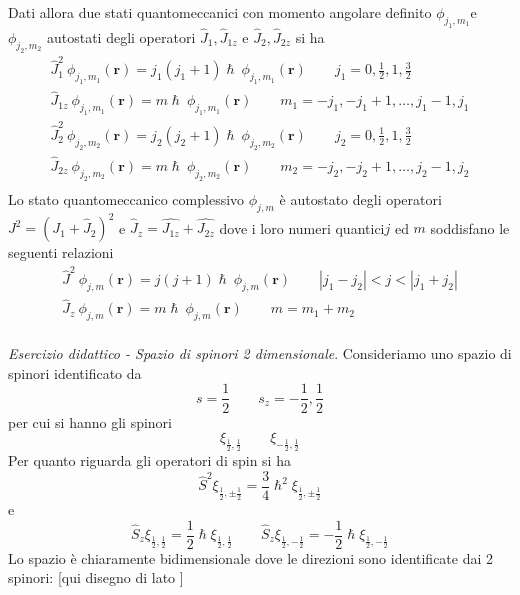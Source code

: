 Dati allora due stati quantomeccanici con momento angolare definito
\(\phi_{j_{1},m_{1}}\)e \(\phi_{j_{2},m_{2}}\) autostati degli operatori
\(\hat{J}_{1},\hat{J}_{1z}\) e \(\hat{J}_{2}, \hat{J}_{2z}\) si ha \begin{gather*}
    \hat{J}_{1}^{2} \ \phi_{j_{1},m_{1}}(\bm{r}) = j_{1}(j_{1}+1) \hslash \ \phi_{j_{1},m_{1}}(\bm{r}) \qquad j_{1} = 0, \frac{1}{2}, 1, \frac{3}{2}\\
    \hat{J}_{1z} \ \phi_{j_{1},m_{1}}(\bm{r}) = m \hslash \ \phi_{j_{1},m_{1}}(\bm{r})  \qquad m_{1} = -j_{1} , -j_{1} +1, \dots , j_{1}-1, j_{1}\\
    \hat{J}_{2}^{2} \ \phi_{j_{2},m_{2}}(\bm{r}) = j_{2}(j_{2}+1) \hslash \ \phi_{j_{2},m_{2}}(\bm{r}) \qquad j_{2} = 0, \frac{1}{2}, 1, \frac{3}{2}\\
    \hat{J}_{2z} \ \phi_{j_{2},m_{2}}(\bm{r}) = m \hslash \ \phi_{j_{2},m_{2}}(\bm{r})  \qquad m_{2} = -j_{2} , -j_{2} +1, \dots , j_{2}-1, j_{2}\\
\end{gather*} Lo stato quantomeccanico complessivo \(\phi_{j,m}\) è autostato degli
operatori \(J^{2} = (J_{1} + \hat{J}_{2})^{2}\) e
\(\hat{J}_{z} = \hat{J_{1z}} + \hat{J_{2z}}\) dove i loro numeri
quantici\(j\) ed \(m\) soddisfano le seguenti relazioni \begin{gather*}
    \hat{J}^{2} \ \phi_{j,m}(\bm{r}) = j(j+1) \hslash \ \phi_{j,m}(\bm{r}) \qquad | j_{1} - j_{2}|<j<|j_{1}+j_{2}|\\
    \hat{J}_{z} \ \phi_{j,m}(\bm{r}) = m \hslash \ \phi_{j,m}(\bm{r})  \qquad m = m_{1}+m_{2}\\
\end{gather*}

\emph{Esercizio didattico - Spazio di spinori 2 dimensionale}.
Consideriamo uno spazio di spinori identificato da \[
                                                       s = \frac{1}{2} \qquad s_{z} = - \frac{1}{2} , \frac{1}{2}
\] per cui si hanno gli spinori \[
                                    \xi_{\frac{1}{2}, \frac{1}{2}} \qquad \xi_{- \frac{1}{2}, \frac{1}{2}}
\] Per quanto riguarda gli operatori di spin si ha \[
                                                       \hat{S}^{2} \xi_{\frac{1}{2}, \pm \frac{1}{2}} = \frac{3}{4} \hslash^{2} \xi_{\frac{1}{2}, \pm \frac{1}{2}}
\] e \[
         \hat{S}_{z} \xi_{\frac{1}{2}, \frac{1}{2}} = \frac{1}{2} \hslash \xi_{\frac{1}{2}, \frac{1}{2}} \qquad
         \hat{S}_{z} \xi_{\frac{1}{2}, - \frac{1}{2}} = - \frac{1}{2} \hslash \xi_{\frac{1}{2}, -\frac{1}{2}}
\] Lo spazio è chiaramente bidimensionale dove le direzioni sono
identificate dai 2 spinori: {[}qui disegno di lato {]}

